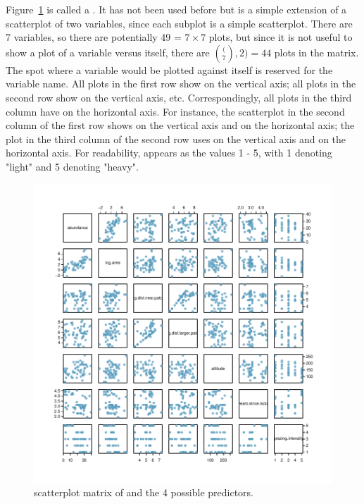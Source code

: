 Figure~\ref{forestbirdsScatterPlotMatrix} is called a .  It has not been used before but is a simple extension of a scatterplot of two variables, since each subplot is a simple scatterplot.  There are 7 variables, so there are potentially 49 = $7\times 7$ plots, but since it is not useful to show a plot of a variable versus itself, there are $\binom(7,2) = 44$ plots in the matrix.  The spot where a variable would be plotted against itself is reserved for the variable name. All plots in the first row show  on the vertical axis; all plots in the second row show  on the vertical axis, etc.  Correspondingly, all plots in the third column have  on the horizontal axis.  For instance, the scatterplot in the second column of the first row shows  on the vertical axis and  on the horizontal axis; the plot in the third column of the second row uses  on the vertical axis and  on the horizontal axis. For readability,  appears as the values 1 - 5, with 1 denoting "light" and 5 denoting "heavy".
    
 \begin{figure}[h!]
 	\centering
 	\includegraphics[width=\textwidth, height=0.75\textheight]
{ch_multiple_linear_regression_oi_biostat/figures/forestbirdsScatterPlotMatrix/forestbirdsScatterPlotMatrix.pdf}
     \caption{scatterplot matrix of  and the 4 possible predictors.}
    	\label{forestbirdsScatterPlotMatrix}
 \end{figure}
 
